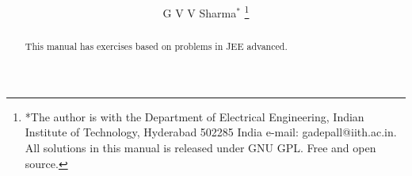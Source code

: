 \documentclass[journal,12pt,twocolumn]{IEEEtran}
\renewcommand\thesection{\arabic{section}}
\begin{document}
\let\StandardTheFigure\thefigure



\makeatletter
{}
\makeatother

\let\StandardTheFigure\thefigure
\let\StandardTheTable\thetable
\let\vec\mathbf





\def\putbox#1#2#3{\makebox[0in][l]{\makebox[#1][l]{}\raisebox{\baselineskip}[0in][0in]{\raisebox{#2}[0in][0in]{#3}}}}
     \def\rightbox#1{\makebox[0in][r]{#1}}
     \def\centbox#1{\makebox[0in]{#1}}
     \def\topbox#1{\raisebox{-\baselineskip}[0in][0in]{#1}}
     \def\midbox#1{\raisebox{-0.5\baselineskip}[0in][0in]{#1}}

\vspace{3cm}

\title{ 
}

\author{ G V V Sharma$^{*}$%
	\thanks{*The author is with the Department
		of Electrical Engineering, Indian Institute of Technology, Hyderabad
		502285 India e-mail:  gadepall@iith.ac.in. All solutions in this manual is released under GNU 
GPL.  Free and open source.}
	
}	

\maketitle

\tableofcontents

\bigskip
\renewcommand{\thetable}{\theenumi}
\begin{abstract}
This manual has exercises   based on 
problems in JEE advanced.
\end{abstract}
\end{document}
